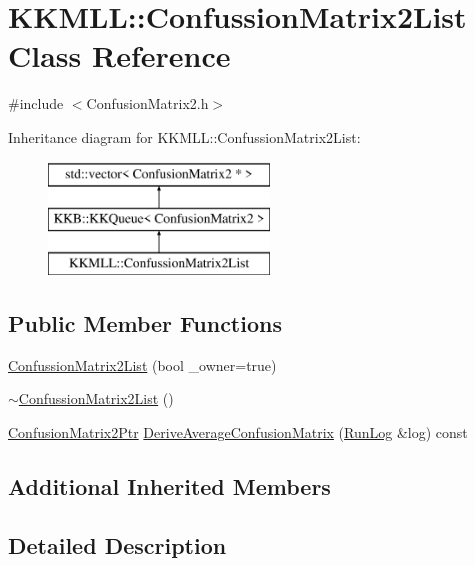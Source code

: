 \hypertarget{class_k_k_m_l_l_1_1_confussion_matrix2_list}{}\section{K\+K\+M\+LL\+:\+:Confussion\+Matrix2\+List Class Reference}
\label{class_k_k_m_l_l_1_1_confussion_matrix2_list}


{\ttfamily \#include $<$Confusion\+Matrix2.\+h$>$}

Inheritance diagram for K\+K\+M\+LL\+:\+:Confussion\+Matrix2\+List\+:\begin{figure}[H]
\begin{center}
\leavevmode
\includegraphics[height=3.000000cm]{class_k_k_m_l_l_1_1_confussion_matrix2_list}
\end{center}
\end{figure}
\subsection*{Public Member Functions}
\begin{DoxyCompactItemize}
\item 
\hyperlink{class_k_k_m_l_l_1_1_confussion_matrix2_list_a398a400c87cd7550752668f7695a4479}{Confussion\+Matrix2\+List} (bool \+\_\+owner=true)
\item 
\hyperlink{class_k_k_m_l_l_1_1_confussion_matrix2_list_a3fc900620cb97e155099375995cb6686}{$\sim$\+Confussion\+Matrix2\+List} ()
\item 
\hyperlink{namespace_k_k_m_l_l_a724c9a3c5315800e128adf68253e91ae}{Confusion\+Matrix2\+Ptr} \hyperlink{class_k_k_m_l_l_1_1_confussion_matrix2_list_ada1cbdb6b7bdc7fcbfc0c705be7587c0}{Derive\+Average\+Confusion\+Matrix} (\hyperlink{class_k_k_b_1_1_run_log}{Run\+Log} \&log) const 
\end{DoxyCompactItemize}
\subsection*{Additional Inherited Members}


\subsection{Detailed Description}


